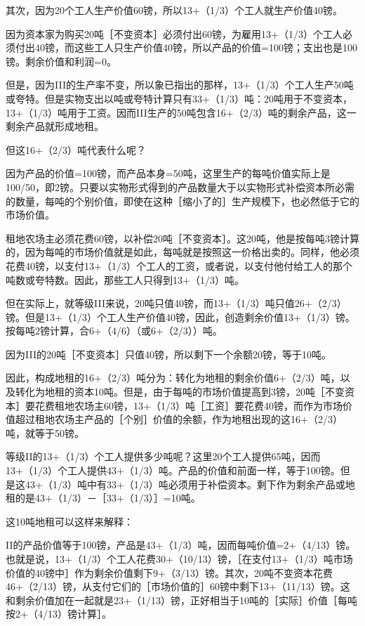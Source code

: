 其次，因为20个工人生产价值60镑，所以13+（1/3）个工人就生产价值40镑。

因为资本家为购买20吨［不变资本］必须付出60镑，为雇用13+（1/3）个工人必须付出40镑，而这些工人只生产价值40镑，所以产品的价值=100镑；支出也是100镑。剩余价值和利润=0。

但是，因为III的生产率不变，所以象已指出的那样，13+（1/3）个工人生产50吨或夸特。但是实物支出以吨或夸特计算只有33+（1/3）吨：20吨用于不变资本，13+（1/3）吨用于工资。因而III生产的50吨包含16+（2/3）吨的剩余产品，这一剩余产品就形成地租。

但这16+（2/3）吨代表什么呢？

因为产品的价值=100镑，而产品本身=50吨，这里生产的每吨价值实际上是100/50，即2镑。只要以实物形式得到的产品数量大于以实物形式补偿资本所必需的数量，每吨的个别价值，即使在这种［缩小了的］生产规模下，也必然低于它的市场价值。

租地农场主必须花费60镑，以补偿20吨［不变资本］。这20吨，他是按每吨3镑计算的，因为每吨的市场价值就是如此，每吨就是按照这一价格出卖的。同样，他必须花费40镑，以支付13+（1/3）个工人的工资，或者说，以支付他付给工人的那个吨数或夸特数。因此，那些工人只得到13+（1/3）吨。

但在实际上，就等级III来说，20吨只值40镑，而13+（1/3）吨只值26+（2/3）镑。但是13+（1/3）个工人生产价值40镑，因此，创造剩余价值13+（1/3）镑。按每吨2镑计算，合6+（4/6）（或6+（2/3））吨。

因为III的20吨［不变资本］只值40镑，所以剩下一个余额20镑，等于10吨。

因此，构成地租的16+（2/3）吨分为：转化为地租的剩余价值6+（2/3）吨，以及转化为地租的资本10吨。但是，由于每吨的市场价值提高到3镑，20吨［不变资本］要花费租地农场主60镑，13+（1/3）吨［工资］要花费40镑，而作为市场价值超过租地农场主产品的［个别］价值的余额，作为地租出现的这16+（2/3）吨，就等于50镑。

等级II的13+（1/3）个工人提供多少吨呢？这里20个工人提供65吨，因而13+（1/3）个工人提供43+（1/3）吨。产品的价值和前面一样，等于100镑。但是这43+（1/3）吨中有33+（1/3）吨必须用于补偿资本。剩下作为剩余产品或地租的是43+（1/3）－［33+（1/3）］=10吨。

这10吨地租可以这样来解释：

II的产品价值等于100镑，产品是43+（1/3）吨，因而每吨价值=2+（4/13）镑。也就是说，13+（1/3）个工人花费30+（10/13）镑，［在支付13+（1/3）吨市场价值的40镑中］作为剩余价值剩下9+（3/13）镑。其次，20吨不变资本花费46+（2/13）镑，从支付它们的［市场价值的］60镑中剩下13+（11/13）镑。这和剩余价值加在一起就是23+（1/13）镑，正好相当于10吨的［实际］价值［每吨按2+（4/13）镑计算］。

